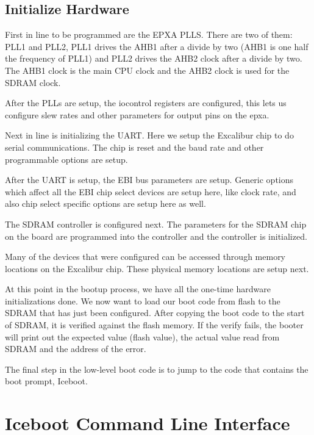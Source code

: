 \documentclass{article}
\begin{document}
	\subsection{Initialize Hardware}

First in line to be programmed are the EPXA PLLS.
There are two of them:  PLL1  and PLL2,
PLL1 drives the AHB1  after a divide by two (AHB1 is
one half the frequency of PLL1) and PLL2 drives the AHB2 
clock after
a divide by two.  The AHB1 clock is the main CPU clock and the
AHB2 clock is used for the SDRAM clock.

After the PLLs are setup, the iocontrol registers are
configured, this lets us configure slew rates and other
parameters for output pins on the epxa.

Next in line is initializing the UART.  Here we setup
the Excalibur chip to do serial communications.  The
chip is reset and the baud rate and other programmable
options are setup.

After the UART is setup, the EBI bus parameters
are setup.  Generic options which affect all the
EBI chip select devices are setup here, like
clock rate, and also chip select specific options
are setup here as well.

The SDRAM controller is configured next.  The
parameters for the SDRAM chip on the board are
programmed into the controller and the controller
is initialized.

Many of the devices that were configured can be
accessed through memory locations on the Excalibur
chip.  These physical memory locations are setup 
next.

 At this point in 
the bootup process, we have all
the one-time hardware initializations done.  We
now want to load our boot code from flash to the
SDRAM that has just been configured.  After copying
the boot code to the start of SDRAM, it is verified
against the flash memory.  If the verify fails, the
booter will print out the expected value (flash value), 
the actual value read from SDRAM and the address of
the error.

The final step in the low-level boot code is to
jump to the code that contains the boot prompt,
Iceboot.

\section{Iceboot Command Line Interface}
\end{document}
